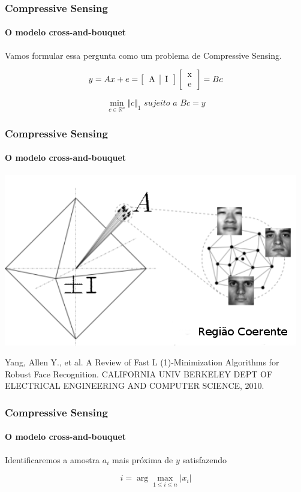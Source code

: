 \documentclass[11pt]{beamer}
\begin{document}
\begin{frame}
\frametitle{Compressive Sensing}
\framesubtitle{O modelo cross-and-bouquet}

Vamos formular essa pergunta como um problema de Compressive Sensing.

$$y = Ax + e = \left[ \begin{tabular}{c | c} A & I \end{tabular} \right] \left[ \begin{tabular}{c} x \\ e \end{tabular}\right] = Bc$$

$$\min_{c \in \mathbb{R}^n} \Vert c \Vert_1 \textit{ sujeito a } Bc = y$$
\end{frame}

\begin{frame}
\frametitle{Compressive Sensing}
\framesubtitle{O modelo cross-and-bouquet}
\centering
\includegraphics[scale=.4]{imagens/cross-and-bouquet.png}

\tiny{Yang, Allen Y., et al. A Review of Fast L (1)-Minimization Algorithms for Robust Face Recognition. CALIFORNIA UNIV BERKELEY DEPT OF ELECTRICAL ENGINEERING AND COMPUTER SCIENCE, 2010.}
\end{frame}

\begin{frame}
\frametitle{Compressive Sensing}
\framesubtitle{O modelo cross-and-bouquet}
\centering
Identificaremos a amostra $a_i$ mais próxima de $y$ satisfazendo

$$i = \arg \max_{1 \leq i \leq n} \vert x_i \vert$$
\end{frame}
\end{document}
